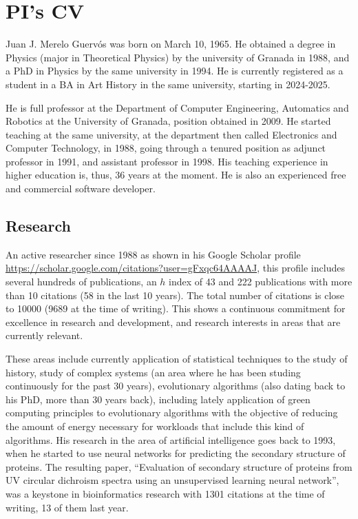 \documentclass[a4paper,12pt]{article}
\begin{document}
\newpage

\section{PI's CV}

Juan J. Merelo Guervós was born on March 10, 1965. He obtained a degree in Physics (major in Theoretical Physics) by the university of Granada in 1988, and a PhD in Physics by the same university in 1994. He is currently registered as a student in a BA in Art History in the same university, starting in 2024-2025.

He is full professor at the Department of Computer Engineering, Automatics and
Robotics at the University of Granada, position obtained in 2009. He started
teaching at the same university, at the department then called Electronics and
Computer Technology, in 1988, going through a tenured position as adjunct
professor in 1991, and assistant professor in 1998. His teaching experience in
higher education is, thus, 36 years at the moment. He is also an experienced
free and commercial software developer.


\subsection{Research}

An active researcher since 1988 as shown in his Google Scholar profile \url{https://scholar.google.com/citations?user=gFxqc64AAAAJ}, this profile includes several hundreds of publications, an $h$ index of 43 and 222 publications with more than 10 citations (58 in the last 10 years). The total number of citations is close to 10000 (9689 at the time of writing). This shows a continuous commitment for excellence in research and development, and research interests in areas that are currently relevant.

These areas include currently application of statistical techniques to the study of history, study of complex systems (an area where he has been studing continuously for the past 30 years), evolutionary algorithms (also dating back to his PhD, more than 30 years back), including lately application of green computing principles to evolutionary algorithms with the objective of reducing the amount of energy necessary for workloads that include this kind of algorithms. His research in the area of artificial intelligence goes back to 1993, when he started to use neural networks for predicting the secondary structure of proteins. The resulting paper, ``Evaluation of secondary structure of proteins from UV circular dichroism spectra using an unsupervised learning neural network'', was a keystone in bioinformatics research with 1301 citations at the time of writing, 13 of them last year.
\end{document}
